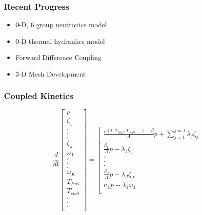 

\begin{frame}[fragile]
  \frametitle{Recent Progress}
  \begin{itemize}
    \item 0-D, 6 group neutronics model
    \item 0-D thermal hydraulics model
    \item Forward Difference Coupling 
    \item 3-D Mesh Development
  \end{itemize}
\end{frame}

\begin{frame}[fragile]
  \frametitle{Coupled Kinetics}
  \footnotesize{
\begin{equation} 
  \frac{d}{dt}\left[
    \begin{array}{c}
      p\\
      \zeta_1\\
      .\\
      .\\
      .\\
      \zeta_J\\
      \omega_1\\
      .\\
      .\\
      .\\
      \omega_K\\
      T_{fuel}\\
      T_{cool}\\
      .\\
      .\\
      .\\
    \end{array}
    \right]
    =
    \left[
      \begin{array}{ c }
        \frac{\rho(t,T_{fuel},T_{cool},\cdots)-\beta}{\Lambda}p + 
        \displaystyle\sum^{j=J}_{j=1}\lambda_j\zeta_j\\
        \frac{\beta_1}{\Lambda} p - \lambda_1\zeta_1\\
        .\\
        .\\
        .\\
        \frac{\beta_J}{\Lambda}p-\lambda_J\zeta_J\\
        \kappa_1p - \lambda_1\omega_1\\

\end{array}
\end{equation}}
\end{frame}
